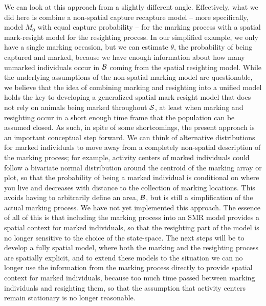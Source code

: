 We can look at this approach from a slightly different
angle. Effectively, what we did here is combine a non-spatial capture
recapture model -- more specifically, model $M_0$ with equal capture
probability -- for the marking process with a spatial mark-resight
model for the resighting process. In our simplified example, we only
have a single marking occasion, but we can estimate $\theta$, the
probability of being captured and marked, because we have enough
information about how many unmarked individuals occur in ${\cal B}$
coming from the spatial resighting model. While the underlying
assumptions of the non-spatial marking model are questionable, we
believe that the idea of combining marking and resighting into a
unified model holds the key to developing a generalized spatial
mark-resight model that does not rely on animals being marked
throughout ${\cal S}$, at least when marking and resighting occur in a
short enough time frame that the population can be assumed closed. As
such, in spite of some shortcomings, the present approach is an
important conceptual step forward. We can think of alternative
distributions for marked individuals to move away from a completely
non-spatial description of the marking process; for example, activity
centers of marked individuals could follow a bivariate normal
distribution around the centroid of the marking array or plot, so that
the probability of being a marked individual is conditional on where
you live and decreases with distance to the collection of marking
locations. This avoids having to arbitrarily define an area, ${\cal
  B}$, but is still a simplification of the actual marking process. We
have not yet implemented this approach.  The essence of all of this is
that including the marking process into an SMR model provides a
spatial context for marked individuals, so that the resighting part of
the model is no longer sensitive to the choice of the state-space. The
next steps will be to develop a fully spatial model, where both the
marking and the resighting process are spatially explicit, and to
extend these models to the situation we can no longer use the
information from the marking process directly to provide spatial
context for marked individuals, because too much time passed between
marking individuals and resighting them, so that the assumption that
activity centers remain stationary is no longer reasonable.


